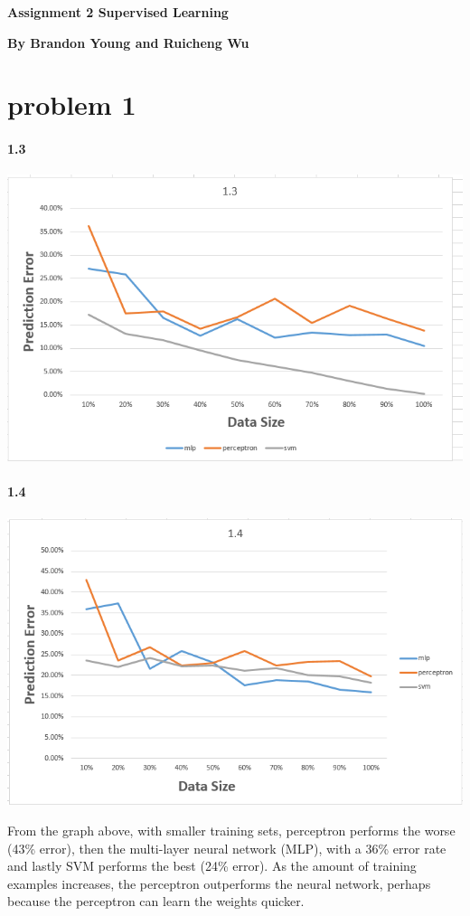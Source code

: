 \documentclass[12pt, letterpaper]{article}
\begin{document}
	\textbf{\large Assignment 2 Supervised Learning}\newline
	
	\textbf{By Brandon Young and Ruicheng Wu}
	\section{problem 1}
	
	\paragraph{1.3\newline}
	\includegraphics[scale=0.8]{"problem-1-3"}
	\paragraph{1.4\newline}
	\includegraphics[scale=0.8]{"problem-1-4"}
	
	\bigskip
	From the graph above, with smaller training sets, perceptron performs the worse (43\% error), then the multi-layer neural network (MLP), with a 36\% error rate and lastly SVM performs the best (24\% error). As the amount of training examples increases, the perceptron outperforms the neural network, perhaps because the perceptron can learn the weights quicker.
	
\end{document}
